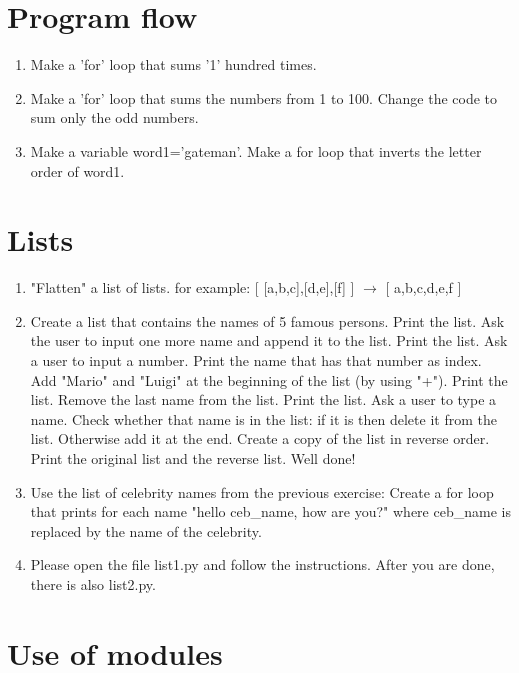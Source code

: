 \documentclass[smallheadings,12pt]{scrartcl}
\begin{document}
\section{Program flow}
\begin{enumerate}
\item Make a 'for' loop that sums '1' hundred times.
\item Make a 'for' loop that sums the numbers from 1 to 100. Change the code to sum only the odd numbers.
\item Make a variable word1='gateman'. Make a for loop that inverts the letter order of word1.
%
\end{enumerate}


\section{Lists}

\begin{enumerate}
\item "Flatten" a list of lists.
for example: [ [a,b,c],[d,e],[f] ] $\rightarrow$ [ a,b,c,d,e,f ]
\item Create a list that contains the names of 5 famous persons. Print the list. Ask the user to input one more name and append it to the list. Print the list. Ask a user to input a number. Print the name that has that number as index. Add "Mario" and "Luigi" at the beginning of the list (by using "+"). Print the list. Remove the last name from the list. Print the list. Ask a user to type a name. Check whether that name is in the list: if it is then delete it from the list. Otherwise add it at the end. Create a copy of the list in reverse order. Print the original list and the reverse list. Well done!
\item Use the list of celebrity names from the previous exercise: Create a for loop that prints for each name "hello ceb\_name, how are you?" where ceb\_name is replaced by the name of the celebrity.
\item Please open the file list1.py and follow the instructions.
After you are done, there is also list2.py.
\end{enumerate}

\section{Use of modules}
\end{document}
